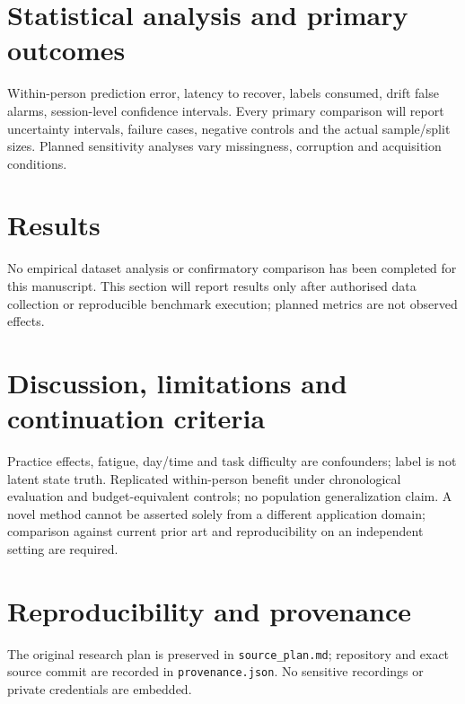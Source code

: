 \documentclass[11pt,a4paper]{article}
\begin{document}
\section{Statistical analysis and primary outcomes}
Within-person prediction error, latency to recover, labels consumed, drift false alarms, session-level confidence intervals. Every primary comparison will report uncertainty intervals, failure cases, negative controls and the actual sample/split sizes. Planned sensitivity analyses vary missingness, corruption and acquisition conditions.
\section{Results}
No empirical dataset analysis or confirmatory comparison has been completed for this manuscript. This section will report results only after authorised data collection or reproducible benchmark execution; planned metrics are not observed effects.
\section{Discussion, limitations and continuation criteria}
Practice effects, fatigue, day/time and task difficulty are confounders; label is not latent state truth. Replicated within-person benefit under chronological evaluation and budget-equivalent controls; no population generalization claim. A novel method cannot be asserted solely from a different application domain; comparison against current prior art and reproducibility on an independent setting are required.
\section{Reproducibility and provenance}
The original research plan is preserved in \texttt{source\_plan.md}; repository and exact source commit are recorded in \texttt{provenance.json}. No sensitive recordings or private credentials are embedded.
\end{document}
